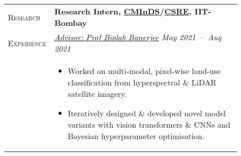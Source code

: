 \documentclass[letterpaper, 10pt, oneside]{article}
\newcommand{\stitle}[1]{\normalsize{\textsc{#1}}}
\newcommand{\bdit}[1]{{\textbf{#1}}}
\begin{document}
\begin{longtable}{@{} p{0.13\linewidth} p{0.8\linewidth}}
    \stitle{Research}    & \bdit{Research Intern, \href{http://www.minds.iitb.ac.in/}{CMInDS}/\href{https://www.csre.iitb.ac.in/}{CSRE}, IIT-Bombay}                                                                                         \\
    \stitle{Experience}  & \textsl{\href{https://biplab-banerjee.github.io/}{Advisor: Prof Biplab Banerjee}} \hfill \textsl{May 2021\ --\ Aug 2021}                                                                                          \\
                         & \parbox{0.8\textwidth}{                                                                                                                                                                                           %
        \begin{itemize}[leftmargin=*, itemsep=-0.88ex, topsep=-0.88ex]
            \item Worked on multi-modal, pixel-wise land-use classification from hyperspectral \& LiDAR satellite imagery.
            \item Iteratively designed \& developed novel model variants with vision transformers \& CNNs and Bayesian hyperparameter optimisation.
        \end{itemize}
    }
    \\
    \\


\end{longtable}
\end{document}
